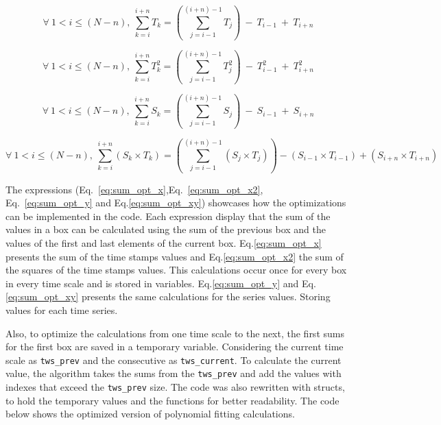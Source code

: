 \documentclass[nojss]{jss}
\begin{document}
\begin{equation}
  \label{eq:sum_opt_x}
  \forall~1<i\leq(N-n),~\sum_{k=i}^{i + n}T_k = \left(\sum_{j=i-1}^{(i+n)-1}T_j\right)~-~T_{i-1}~+~T_{i + n}
\end{equation}

\begin{equation}
  \label{eq:sum_opt_x2}
  \forall~1<i\leq(N-n),~\sum_{k=i}^{i + n}T_k^2 = \left(\sum_{j=i-1}^{(i+n)-1}T_j^2\right)~-~T_{i-1}^2~+~T_{i + n}^2
\end{equation}

\begin{equation}
  \label{eq:sum_opt_y}
  \forall~1<i\leq(N-n),~\sum_{k=i}^{i + n}S_k = \left(\sum_{j=i-1}^{(i+n)-1}S_j\right)~-~S_{i-1}~+~S_{i + n}
\end{equation}

\begin{equation}
  \label{eq:sum_opt_xy}
  \forall~1<i\leq(N-n),~\sum_{k=i}^{i + n} (S_k\times T_k) = \left(\sum_{j=i-1}^{(i+n)-1}(S_j \times T_j)\right)-(S_{i-1} \times T_{i-1})+(S_{i + n} \times T_{i + n})
\end{equation}

The expressions (Eq.~\ref{eq:sum_opt_x},Eq.~\ref{eq:sum_opt_x2}, Eq.~\ref{eq:sum_opt_y} and Eq.\ref{eq:sum_opt_xy}) showcases how the optimizations can be implemented in the code. Each expression display that the sum of the values in a box can be calculated using the sum of the previous box and the values of the first and last elements of the current box. Eq.\ref{eq:sum_opt_x} presents the sum of the time stamps values and Eq.\ref{eq:sum_opt_x2} the sum of the squares of the time stamps values. This calculations occur once for every box in every time scale and is stored in variables. Eq.\ref{eq:sum_opt_y} and Eq.\ref{eq:sum_opt_xy} presents the same calculations for the series values. Storing values for each time series.

Also, to optimize the calculations from one time scale to the next, the first sums for the first box are saved in a temporary variable. Considering the current time scale as \verb"tws_prev" and the consecutive as \verb"tws_current". To calculate the current value, the algorithm takes the sums from the \verb"tws_prev" and add the values with indexes that exceed the \verb"tws_prev" size. The code was also rewritten with structs, to hold the temporary values and the functions for better readability. The code below shows the optimized version of polynomial fitting calculations.
\end{document}
